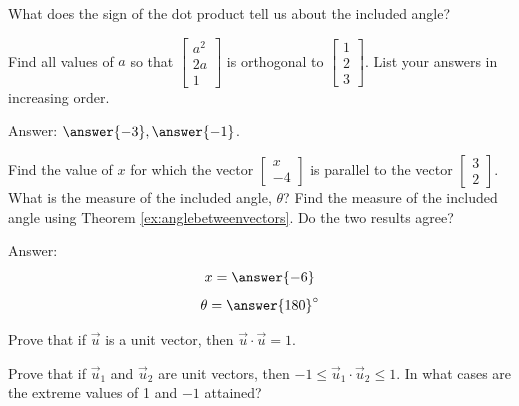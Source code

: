 \documentclass{ximera}
\begin{document}
\begin{problem}
What does the sign of the dot product tell us about the included angle?
\end{problem}

\begin{problem}
Find all values of $a$ so that $\begin{bmatrix}a^2\\2a\\1\end{bmatrix}$ is orthogonal to $\begin{bmatrix}1\\2\\3\end{bmatrix}$.  List your answers in increasing order.

Answer: $\answer{-3}, \answer{-1}$.
\end{problem}

\begin{problem}
Find the value of $x$ for which the vector $\begin{bmatrix}x\\-4\end{bmatrix}$ is parallel to the vector $\begin{bmatrix}3\\2\end{bmatrix}$. What is the measure of the included angle, $\theta$? Find the measure of the included angle using Theorem \ref{ex:anglebetweenvectors}.  Do the two results agree?

Answer: 
$$x=\answer{-6}$$
$$\theta=\answer{180}^\circ$$
\end{problem}

\begin{problem}
Prove that if $\vec{u}$ is a unit vector, then $\vec{u}\cdot \vec{u}=1$.
\end{problem}

\begin{problem}
 Prove that if $\vec{u}_1$ and $\vec{u}_2$ are unit vectors, then $-1\leq\vec{u}_1\cdot \vec{u}_2\leq 1$.  In what cases are the extreme values of 1 and $-1$ attained?
\end{problem} 
\end{document}
